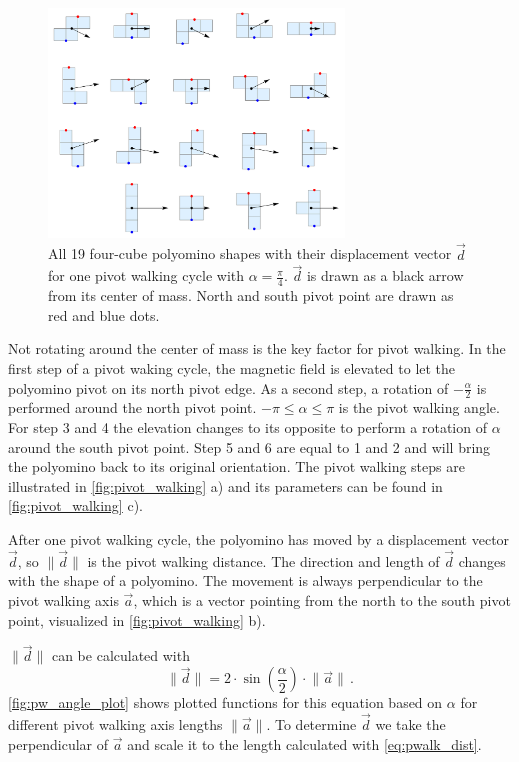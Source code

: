 \begin{figure}
	\centering
	\includegraphics[width=0.70\textwidth]{figures/displacement_pivot_walking.pdf}
	\caption[Polyomino shapes with different displacement vectors]{All 19 four-cube polyomino shapes with their displacement vector $\vec{d}$ for one pivot walking cycle with $\alpha = \frac{\pi}{4}$. $\vec{d}$ is drawn as a black arrow from its center of mass. North and south pivot point are drawn as red and blue dots.}
	\label{fig:displacement_pivot_walking}
\end{figure}

Not rotating around the center of mass is the key factor for pivot walking.
In the first step of a pivot waking cycle, the magnetic field is elevated to let the polyomino pivot on its north pivot edge.
As a second step, a rotation of $-\frac{\alpha}{2}$ is performed around the north pivot point.
$-\pi \leq \alpha \leq \pi$ is the pivot walking angle.
For step 3 and 4 the elevation changes to its opposite to perform a rotation of $\alpha$ around the south pivot point.
Step 5 and 6 are equal to 1 and 2 and will bring the polyomino back to its original orientation.
The pivot walking steps are illustrated in \autoref{fig:pivot_walking} a) and its parameters can be found in \autoref{fig:pivot_walking} c).

After one pivot walking cycle, the polyomino has moved by a displacement vector $\vec{d}$, so $\lVert \vec{d} \rVert$ is the pivot walking distance.
The direction and length of $\vec{d}$ changes with the shape of a polyomino.
The movement is always perpendicular to the pivot walking axis $\vec{a}$, which is a vector pointing from the north to  the south pivot point, visualized in \autoref{fig:pivot_walking} b).

$\lVert \vec{d} \rVert$ can be calculated with
\begin{equation}\label{eq:pwalk_dist}
\lVert \vec{d} \rVert = 2 \cdot \sin\left(\frac{\alpha}{2} \right) \cdot \lVert \vec{a} \rVert \,.
\end{equation}
\autoref{fig:pw_angle_plot} shows plotted functions for this equation based on $\alpha$ for different pivot walking axis lengths $\lVert \vec{a} \rVert$.
To determine $\vec{d}$ we take the perpendicular of $\vec{a}$ and scale it to the length calculated with \autoref{eq:pwalk_dist}.

